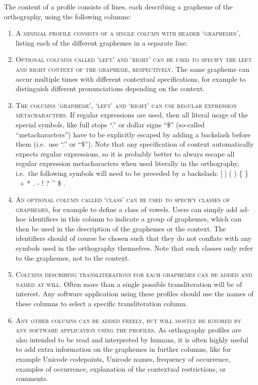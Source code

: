 The content of a profile consists of lines, each describing a grapheme of the orthography, using the following columns:
\begin{enumerate}
	\def\labelenumi{\arabic{enumi}.} 
	\item \textsc{A minimal profile consists of a single column with header `graphemes'}, listing each of the different graphemes in a separate line. 
	\item \textsc{Optional columns called `left' and `right' can be used to specify the left and right context of the grapheme, respectively.} The same grapheme can occur multiple times with different contextual specifications, for example to distinguish different pronunciations depending on the context. 
	\item \textsc{The columns `grapheme', `left' and `right' can use regular expression metacharacters.} If regular expressions are used, then all literal usage of the special symbols, like full stops ``.'' or dollar signs ``\$'' (so-called ``metacharacters'') have to be explicitly escaped by adding a backslash before them (i.e.~use ``.'' or ``\$''). Note that any specification of context automatically expects regular expressions, so it is probably better to always escape all regular expression metacharacters when used literally in the orthography, i.e.~the following symbols will need to be preceded by a backslash: {[} {]} ( ) \{ \} ~+ * . - ! ? \^{} \$ . 
	\item \textsc{An optional column called `class' can be used to specify classes of graphemes}, for example to define a class of vowels. Users can simply add ad-hoc identifiers in this column to indicate a group of graphemes, which can then be used in the description of the graphemes or the context. The identifiers should of course be chosen such that they do not conflate with any symbols used in the orthography themselves. Note that such classes only refer to the graphemes, not to the context. 
	\item \textsc{Columns describing transliterations for each graphemes can be added and named at will}. Often more than a single possible transliteration will be of interest. Any software application using these profiles should use the names of these columns to select a specific transliteration column. 
	\item \textsc{Any other columns can be added freely, but will mostly be ignored by any software application using the profiles}. As orthography profiles are also intended to be read and interpreted by humans, it is often highly useful to add extra information on the graphemes in further columns, like for example Unicode codepoints, Unicode names, frequency of occurrence, examples of occurrence, explanation of the contextual restrictions, or comments. 
\end{enumerate}

